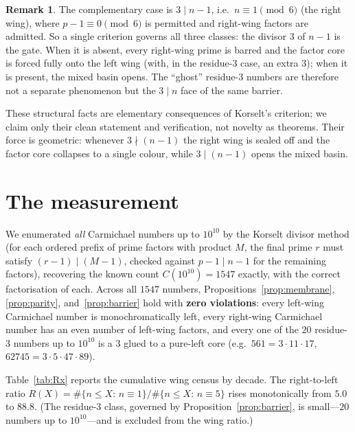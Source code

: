 \documentclass[11pt]{article}
\theoremstyle{plain}
\theoremstyle{definition}
\newtheorem{remark}{Remark}
\begin{document}
\begin{remark}\label{rem:unify}
The complementary case is $3\mid n-1$, i.e.\ $n\equiv1\pmod6$ (the right wing), where $p-1\equiv0\pmod6$
is permitted and right-wing factors are admitted. So a single criterion governs all three classes: the
divisor $3$ of $n-1$ is the gate. When it is absent, every right-wing prime is barred and the factor
core is forced fully onto the left wing (with, in the residue-$3$ case, an extra $3$); when it is
present, the mixed basin opens. The ``ghost'' residue-$3$ numbers are therefore not a separate
phenomenon but the $3\mid n$ face of the same barrier.
\end{remark}

These structural facts are elementary consequences of Korselt's criterion; we claim only their clean
statement and verification, not novelty as theorems. Their force is geometric: whenever $3\nmid(n-1)$
the right wing is sealed off and the factor core collapses to a single colour, while $3\mid(n-1)$ opens
the mixed basin.

\section{The measurement}
We enumerated \emph{all} Carmichael numbers up to $10^{10}$ by the Korselt divisor method (for each
ordered prefix of prime factors with product $M$, the final prime $r$ must satisfy $(r-1)\mid(M-1)$,
checked against $p-1\mid n-1$ for the remaining factors), recovering the known count $C(10^{10})=1547$
\cite{Pinch} exactly, with the correct factorisation of each. Across all $1547$ numbers,
Propositions~\ref{prop:membrane}, \ref{prop:parity}, and~\ref{prop:barrier} hold with \textbf{zero
violations}: every left-wing Carmichael number is monochromatically left, every right-wing Carmichael
number has an even number of left-wing factors, and every one of the $20$ residue-$3$ numbers up to
$10^{10}$ is a $3$ glued to a pure-left core (e.g.\ $561=3\cdot11\cdot17$, $62745=3\cdot5\cdot47\cdot89$).

Table~\ref{tab:Rx} reports the cumulative wing census by decade. The right-to-left ratio
$R(X)=\#\{n\le X:\,n\equiv1\}/\#\{n\le X:\,n\equiv5\}$ rises monotonically from $5.0$ to $88.8$.
(The residue-$3$ class, governed by Proposition~\ref{prop:barrier}, is small---$20$ numbers up to
$10^{10}$---and is excluded from the wing ratio.)
\end{document}
